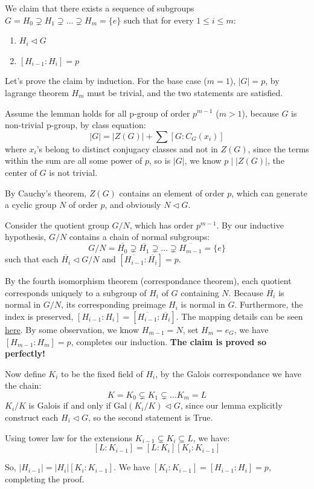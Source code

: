 \documentclass{article}
\begin{document}
We claim that there exists a sequence of subgroups $G=H_0\supsetneq H_1\supsetneq \dots\supsetneq H_m=\{e\}$ such that for every $1\le i\le m$:
\begin{enumerate}
    \item $H_i\triangleleft G$
    \item $[H_{i-1}:H_i]=p$
\end{enumerate}
Let's prove the claim by induction. For the base case ($m=1$), $|G|=p$, by lagrange theorem $H_m$ must be trivial, and the two statements are satisfied.

Assume the lemman holds for all p-group of order $p^{m-1}$ ($m>1$), because $G$ is non-trivial p-group, by class equation:
$$|G|=|Z(G)|+\sum{[G:C_G(x_i)]}$$
where $x_i$'s belong to distinct conjugacy classes and not in $Z(G)$, since the terms within the sum are all some power of $p$, so is $|G|$, we know $p\mid|Z(G)|$, the center of $G$ is not trivial.

By Cauchy's theorem, $Z(G)$ contains an element of order $p$, which can generate a cyclic group $N$ of order $p$, and obviously $N\triangleleft G$.

Consider the quotient group $G/N$, which has order $p^{m-1}$. By our inductive hypothesis, $G/N$ contains a chain of normal subgroups:
$$G/N=\overline{H_0}\supsetneq \overline{H_1}\supsetneq\ldots\supsetneq \overline{H_{m-1}}=\{e\}$$
such that each $\overline{H_i}\triangleleft G/N$ and $[\overline{H_{i-1}}:\overline{H_{i}}]=p$.

By the fourth isomorphism theorem (correspondance theorem), each quotient corresponds uniquely to a subgroup of $H_i$ of $G$ containing $N$. Because $\overline{H_i}$ is normal in $G/N$, its corresponding preimage $H_i$ is normal in $G$. Furthermore, the index is preserved, $[H_{i-1}:H_i]=[\overline{H_{i-1}}:\overline{H_i}]$. The mapping details can be seen \href{https://en.wikipedia.org/wiki/Correspondence_theorem}{here}. By some observation, we know $H_{m-1}=N$, set $H_{m}={e_G}$, we have $[H_{m-1}:H_m]=p$, completes our induction. \textbf{The claim is proved so perfectly!}  

Now define $K_i$ to be the fixed field of $H_i$, by the Galois correspondance we have the chain:
$$K=K_0\subsetneq K_1\subsetneq\ldots K_m=L$$
$K_i/K$ is Galois if and only if $\mathrm{Gal}(K_i/K)\triangleleft G$, since our lemma explicitly construct each $H_i\triangleleft G$, so the second statement is True.

Using tower law for the extensions $K_{i-1}\subsetneq K_{i}\subseteq L$, we have:
$$[L:K_{i-1}]=[L:K_{i}][K_{i}:K_{i-1}]$$

So, $|H_{i-1}|=|H_i|[K_{i}:K_{i-1}]$. We have $[K_{i}:K_{i-1}]=[H_{i-1}:H_i]=p$, completing the proof.
\end{document}
